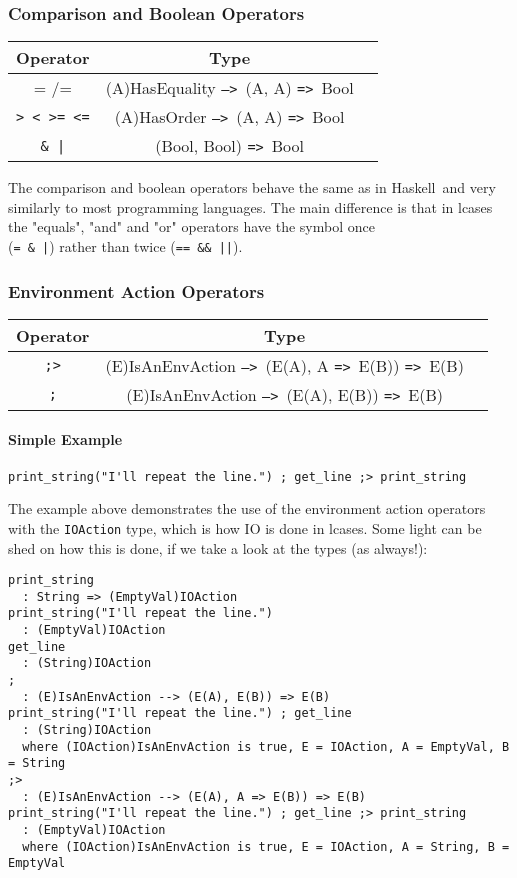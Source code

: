 \documentclass{article}
\def\H{Haskell}
\def\ra{\texttt{=>}\ }
\def\Ra{\texttt{-->}\ }
\begin{document}
\subsubsection{Comparison and Boolean Operators}

\begin{center}
\begin{tabular}{ |c|c|c| } 
\hline
Operator & Type \\ 
\hline
\hline
= /= & (A)HasEquality \Ra (A, A) \ra Bool \\
\hline
\texttt{> < >= <=} & (A)HasOrder \Ra (A, A) \ra Bool \\
\hline
\texttt{\& |} & (Bool, Bool) \ra Bool \\
\hline
\end{tabular}
\end{center}
The comparison and boolean operators behave the same as in \H\ and very
similarly to most programming languages. The main difference is that in lcases
the "equals", "and" and "or" operators have the symbol once \\(\texttt{= \& |})
rather than twice (\texttt{== \&\& ||}).

\subsubsection{Environment Action Operators}
\label{subsec:envacts}

\begin{center}
\begin{tabular}{ |c|c|c| } 
\hline
Operator & Type \\ 
\hline
\hline
\texttt{;>} & (E)IsAnEnvAction \Ra (E(A), A \ra E(B)) \ra E(B) \\
\hline
\texttt{;} & (E)IsAnEnvAction \Ra (E(A), E(B)) \ra E(B) \\
\hline
\end{tabular}
\end{center}

\paragraph{Simple Example}
\begin{verbatim}
print_string("I'll repeat the line.") ; get_line ;> print_string
\end{verbatim}
The example above demonstrates the use of the environment action operators with
the \texttt{IOAction} type, which is how IO is done in lcases. Some light can
be shed on how this is done, if we take a look at the types (as always!):
\begin{verbatim}
print_string
  : String => (EmptyVal)IOAction
print_string("I'll repeat the line.")
  : (EmptyVal)IOAction
get_line
  : (String)IOAction
; 
  : (E)IsAnEnvAction --> (E(A), E(B)) => E(B) 
print_string("I'll repeat the line.") ; get_line
  : (String)IOAction
  where (IOAction)IsAnEnvAction is true, E = IOAction, A = EmptyVal, B = String
;>
  : (E)IsAnEnvAction --> (E(A), A => E(B)) => E(B) 
print_string("I'll repeat the line.") ; get_line ;> print_string
  : (EmptyVal)IOAction
  where (IOAction)IsAnEnvAction is true, E = IOAction, A = String, B = EmptyVal
\end{verbatim}
\end{document}
